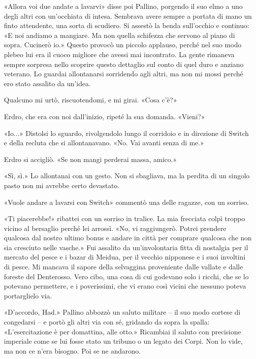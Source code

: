 «Allora voi due andate a lavarvi» disse poi Pallino, porgendo il suo
elmo a uno degli altri con un'occhiata di intesa. Sembrava avere sempre
a portata di mano un finto attendente, una sorta di scudiero. Si assestò
la benda sull'occhio e continuo: «E noi andiamo a mangiare. Ma non
quella schifezza che servono al piano di sopra. Cucinerò io.» Questo
provocò un piccolo applauso, perché nel suo modo plebeo lui era il cuoco
migliore che avessi mai incontrato. La gente rimaneva sempre sorpresa
nello scoprire questo dettaglio sul conto di quel duro e anziano
veterano. Lo guardai allontanarsi sorridendo agli altri, ma non mi mossi
perché ero stato assalito da un'idea.

Qualcuno mi urtò, riscuotendomi, e mi girai. «Cosa c'è?»

Erdro, che era con noi dall'inizio, ripeté la sua domanda. «Vieni?»

«Io...» Distolsi lo sguardo, rivolgendolo lungo il corridoio e in
direzione di Switch e della recluta che si allontanavano. «No. Vai
avanti senza di me.»

Erdro si accigliò. «Se non mangi perderai massa, amico.»

«Sì, sì.» Lo allontanai con un gesto. Non si sbagliava, ma la perdita di
un singolo pasto non mi avrebbe certo devastato.

«Vuole andare a lavarsi con Switch» commentò una delle ragazze, con un
sorriso.

«Ti piacerebbe!» ribattei con un sorriso in tralice. La mia frecciata
colpì troppo vicino al bersaglio perché lei arrossì. «No, vi
raggiungerò. Potrei prendere qualcosa dal nostro ultimo bonus e andare
in città per comprare qualcosa che non sia cresciuto nelle vasche.» Fui
assalito da un'involontaria fitta di nostalgia per il mercato del pesce
e i bazar di Meidua, per il vecchio nipponese e i suoi involtini di
pesce. Mi mancava il sapore della selvaggina proveniente dalle vallate e
dalle foreste del Denterosso. Vero cibo, una cosa di cui {godevano} solo
i ricchi, che se lo potevano permettere, e i poverissimi, che vi erano
così vicini che nessuno poteva portarglielo via.

«D'accordo, Had.» Pallino abbozzò un saluto militare -- il suo modo
cortese di congedarsi -- e portò gli altri via con sé, gridando da sopra
la spalla: «L'esercitazione è per domattina, alle otto.» Ricambiai il
saluto con precisione imperiale come se lui fosse stato un tribuno o un
legato dei Corpi. Non lo vide, ma non ce n'era bisogno. Poi se ne
andarono.

